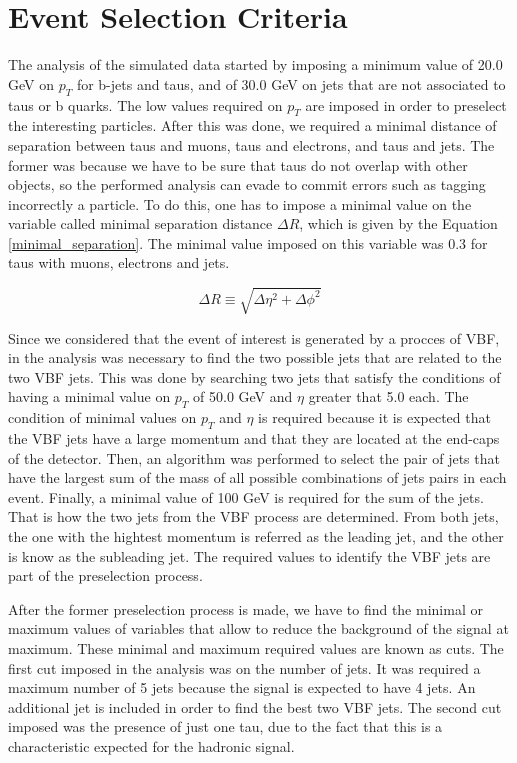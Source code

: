 \chapter{Event Selection Criteria}
\label{Event_selection_criteria_chapter}

The analysis of the simulated data started by imposing a minimum value of 20.0 GeV on $p_T$ for b-jets and taus, and of 30.0 GeV on jets that are not associated to taus or b quarks. The low values 
required on $p_T$ are imposed in order to preselect the interesting particles. After this was done, we required a minimal distance of separation between taus and muons, taus and electrons, 
and taus and jets. The former was because we have to be sure that taus do not overlap with other objects, so the performed analysis can evade to commit errors such as tagging incorrectly a particle.
To do this, one has to impose a minimal value on the variable called minimal separation distance $\Delta R$, which is given by the Equation \ref{minimal_separation}. The minimal value imposed on this 
variable was 0.3 for taus with muons, electrons and jets. 

\begin{equation}
\Delta R \equiv \sqrt{\Delta \eta ^2 + \Delta \phi ^2}
\label{minimal_separation}
\end{equation}

Since we considered that the event of interest is generated by a procces of VBF, in the analysis was necessary to find the two possible jets that are related to the two VBF jets. This was done by 
searching two jets that satisfy the conditions of having a minimal value on $p_T$ of 50.0 GeV and $\eta$ greater that 5.0 each. The condition of minimal values on $p_T$ and $\eta$ is required 
because it is expected that the VBF jets have a large momentum and that they are located at the end-caps of the detector. Then, an algorithm was performed to select the pair of jets that have the 
largest sum of the mass of all possible combinations of jets pairs in each event. Finally, a minimal value of 100 GeV is required for the sum of the jets. That is how the two jets from the VBF 
process are determined. From both jets, the one with the hightest momentum is referred as the leading jet, and the other is know as the subleading jet. The required values to identify the VBF 
jets are part of the preselection process.

After the former preselection process is made, we have to find the minimal or maximum values of variables that allow to reduce the background of the signal at maximum. These minimal and maximum
required values are known as cuts. The first cut imposed in the analysis was on the number of jets. It was required a maximum number of 5 jets because the signal is expected to have 4 jets. An
additional jet is included in order to find the best two VBF jets. The second cut imposed was the presence of just one tau, due to the fact that this is a characteristic expected for the hadronic 
signal. 

